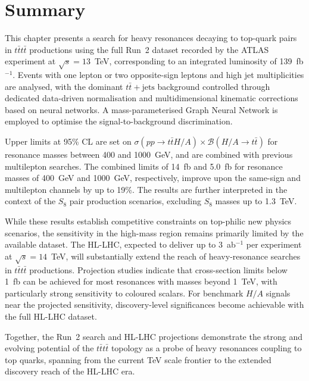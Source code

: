 \section{Summary}
\label{sec:conclusion}

This chapter presents a search for heavy resonances decaying to top-quark pairs in $t\bar{t}t\bar{t}$ productions using the full Run~2 dataset recorded by the ATLAS experiment at $\sqrt{s}=13$~TeV, corresponding to an integrated luminosity of 139~fb$^{-1}$. 
Events with one lepton or two opposite-sign leptons and high jet multiplicities are analysed, with the dominant $t\bar{t}+\text{jets}$ background controlled through dedicated data-driven normalisation and multidimensional kinematic corrections based on neural networks. 
A mass-parameterised Graph Neural Network is employed to optimise the signal-to-background discrimination.

Upper limits at 95\% CL are set on $\sigma(pp \to t\bar{t}H/A)\times \mathcal{B}(H/A \to t\bar{t})$ for resonance masses between 400 and 1000~GeV, and are combined with previous multilepton searches. 
The combined limits of 14~fb and 5.0~fb for resonance masses of 400~GeV and 1000~GeV, respectively, improve upon the same-sign and multilepton channels by up to 19\%. 
The results are further interpreted in the context of the $S_{8}$ pair production scenarios, excluding $S_{8}$ masses up to 1.3~TeV.

While these results establish competitive constraints on top-philic new physics scenarios, the sensitivity in the high-mass region remains primarily limited by the available dataset. 
The HL-LHC, expected to deliver up to 3~ab$^{-1}$ per experiment at $\sqrt{s}=14$~TeV, will substantially extend the reach of heavy-resonance searches in $t\bar{t}t\bar{t}$ productions. 
Projection studies indicate that cross-section limits below 1~fb can be achieved for most resonances with masses beyond 1~TeV, with particularly strong sensitivity to coloured scalars. 
For benchmark $H/A$ signals near the projected sensitivity, discovery-level significances become achievable with the full HL-LHC dataset.

Together, the Run~2 search and HL-LHC projections demonstrate the strong and evolving potential of the $t\bar{t}t\bar{t}$ topology as a probe of heavy resonances coupling to top quarks, spanning from the current TeV scale frontier to the extended discovery reach of the HL-LHC era.